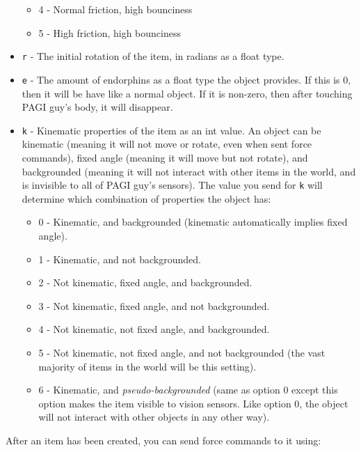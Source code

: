 \begin{itemize}
\begin{itemize}
	\item 4 - Normal friction, high bounciness
	\item 5 - High friction, high bounciness
	\end{itemize}
\item \texttt{r} - The initial rotation of the item, in radians as a float type. 
\item \texttt{e} - The amount of endorphins as a float type the object provides. If this is 0, then it will be have like a normal object. If it is non-zero, then after touching PAGI guy's body, it will disappear.
\item \texttt{k} - Kinematic properties of the item as an int value. An object can be kinematic (meaning it will not move or rotate, even when sent force commands), fixed angle (meaning it will move but not rotate), and backgrounded (meaning it will not interact with other items in the world, and is invisible to all of PAGI guy's sensors). The value you send for \texttt{k} will determine which combination of properties the object has:
	\begin{itemize}
	\item 0 - Kinematic, and backgrounded (kinematic automatically implies fixed angle).
	\item 1 - Kinematic, and not backgrounded. 
	\item 2 - Not kinematic, fixed angle, and backgrounded.
	\item 3 - Not kinematic, fixed angle, and not backgrounded.
	\item 4 - Not kinematic, not fixed angle, and backgrounded.
	\item 5 - Not kinematic, not fixed angle, and not backgrounded (the vast majority of items in the world will be this setting).
	\item 6 - Kinematic, and \textit{pseudo-backgrounded} (same as option 0 except this option makes the item visible to vision sensors. Like option 0, the object will not interact with other objects in any other way).
	\end{itemize}
\end{itemize}

After an item has been created, you can send force commands to it using:


